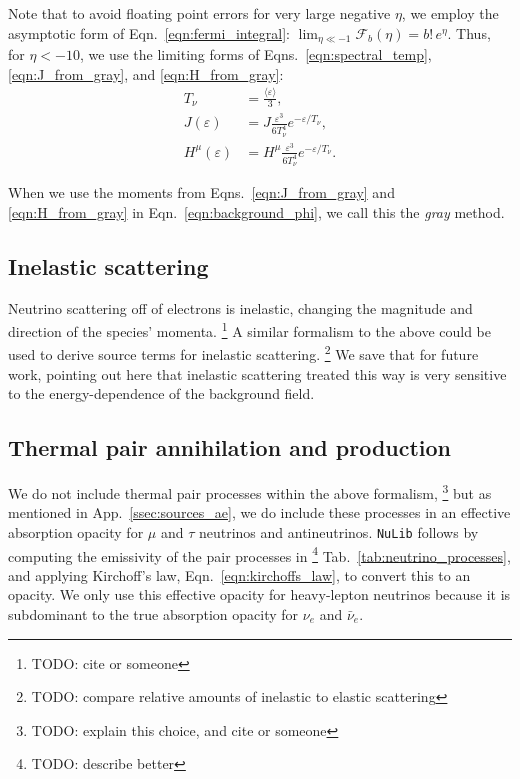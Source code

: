 \documentclass[aps,floatfix,prd,superscriptaddress,twocolumn]{revtex4-1}
\begin{document}
Note that to avoid floating point errors for very large negative $\eta$,
we employ the asymptotic form of Eqn.~\ref{eqn:fermi_integral}:
$\lim_{\eta\ll-1}\mathscr{F}_b(\eta) = b!\,e^\eta$.
Thus, for $\eta<-10$, we use the limiting forms of
Eqns.~\ref{eqn:spectral_temp},
\ref{eqn:J_from_gray},
and \ref{eqn:H_from_gray}:
\begin{align}
    T_\nu &= 
    \frac{\langle \varepsilon \rangle}{3}, \\
    J(\varepsilon) &=
    J \frac{\varepsilon^3}{6 T_\nu^4} e^{-\varepsilon/T_\nu}, \\
    H^\mu(\varepsilon) &=
    H^\mu \frac{\varepsilon^3}{6 T_\nu^4} e^{-\varepsilon/T_\nu}.
\end{align}

When we use the moments from Eqns.~\ref{eqn:J_from_gray} and
\ref{eqn:H_from_gray} in Eqn.~\ref{eqn:background_phi},
we call this the \emph{gray} method.

\subsection{Inelastic scattering}
\label{ssec:sources_si}
Neutrino scattering off of electrons is inelastic, changing the
magnitude and direction of the species' momenta.
\footnote{TODO: cite \cite{keil2003-pinched_spectra} or someone}
A similar formalism to the above could be used to derive source terms
for inelastic scattering.
\footnote{TODO: compare relative amounts of inelastic to elastic scattering}
We save that for future work, pointing out here that inelastic scattering
treated this way is very sensitive to the energy-dependence of
the background field.

\subsection{Thermal pair annihilation and production}
\label{ssec:sources_pp}
We do not include thermal pair processes within the above formalism,
\footnote{TODO: explain this choice, and cite \cite{keil2003-pinched_spectra} or someone}
but as mentioned in App.~\ref{ssec:sources_ae}, we do include
these processes in an effective absorption opacity for $\mu$ and $\tau$
neutrinos and antineutrinos. \lstinline{NuLib} follows
\cite{brue1985-core_collapse,burr2006-neutrino_opacities}
by computing the emissivity of the pair processes in
\footnote{TODO: describe better}
Tab.~\ref{tab:neutrino_processes}, and applying Kirchoff's law,
Eqn.~\ref{eqn:kirchoffs_law}, to convert this to an opacity.
We only use this effective opacity for heavy-lepton neutrinos because
it is subdominant to the true absorption opacity for
$\nu_e$ and $\bar{\nu}_e$.
\end{document}
